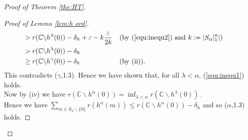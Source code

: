 \documentclass{strippedproc-l}
\theoremstyle{definition}
\theoremstyle{remark}
\numberwithin{equation}{section}
\begin{document}
\begin{proof}[Proof of Theorem \ref{the:HT}]
\begin{proof}[Proof of Lemma \ref{lem:h ord}]
\begin{align*}
&>r(\mathbb{C}\backslash h^{\lambda}(0))-\delta_{h}+\varepsilon-k\frac{\varepsilon}{2k}& &(\mbox{by (\ref{equ:inequ2}) and }k:=|S_{\alpha}|_{1}^{n}|)&\\
&>r(\mathbb{C}\backslash h^{\lambda}(0))-\delta_{h}& &&\\
&\ge r(\mathbb{C}\backslash h^{\gamma}(0))-\delta_{h}& &(\mbox{by (ii)}).&
\end{align*}
This contradicts ($\gamma$,1.3). Hence we have shown that, for all $\lambda<\alpha$, (\ref{equ:inequ1}) holds.\\ Now by (iv) we have $r(\mathbb{C}\backslash h^{\alpha}(0))=\inf_{\lambda<\alpha}r(\mathbb{C}\backslash h^{\lambda}(0))$.\\ Hence we have $\sum_{m\in S_{\alpha}\backslash\{0\}}r(h^{\alpha}(m))\le r(\mathbb{C}\backslash h^{\alpha}(0))-\delta_{h}$ and so ($\alpha$,1.3) holds.


\end{proof}
\end{proof}
\end{document}
